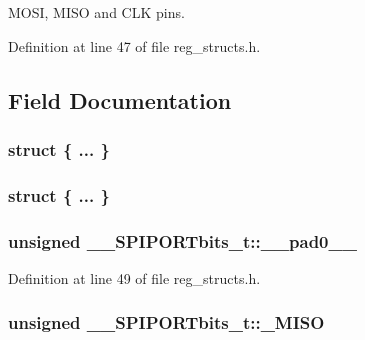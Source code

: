 M\-O\-S\-I, M\-I\-S\-O and C\-L\-K pins. 

Definition at line 47 of file reg\-\_\-structs.\-h.



\subsection{Field Documentation}
\hypertarget{union_____s_p_i_p_o_r_tbits__t_a6fab1639d02b4dc3b97c6d30adcb6aba}{\subsubsection[{"@5}]{\setlength{\rightskip}{0pt plus 5cm}struct \{ ... \} }}\label{union_____s_p_i_p_o_r_tbits__t_a6fab1639d02b4dc3b97c6d30adcb6aba}
\hypertarget{union_____s_p_i_p_o_r_tbits__t_a4b5b807caba6b1efc8ea89424950b34e}{\subsubsection[{"@7}]{\setlength{\rightskip}{0pt plus 5cm}struct \{ ... \} }}\label{union_____s_p_i_p_o_r_tbits__t_a4b5b807caba6b1efc8ea89424950b34e}
\hypertarget{union_____s_p_i_p_o_r_tbits__t_adaa7058ebdf3984a666270efbbd35783}{
\subsubsection[{\-\_\-\-\_\-pad0\-\_\-\-\_\-}]{\setlength{\rightskip}{0pt plus 5cm}unsigned \-\_\-\-\_\-\-S\-P\-I\-P\-O\-R\-Tbits\-\_\-t\-::\-\_\-\-\_\-pad0\-\_\-\-\_\-}}\label{union_____s_p_i_p_o_r_tbits__t_adaa7058ebdf3984a666270efbbd35783}


Definition at line 49 of file reg\-\_\-structs.\-h.

\hypertarget{union_____s_p_i_p_o_r_tbits__t_a495a90d64370d78287cb8ab826e3822e}{
\subsubsection[{\-\_\-\-M\-I\-S\-O}]{\setlength{\rightskip}{0pt plus 5cm}unsigned \-\_\-\-\_\-\-S\-P\-I\-P\-O\-R\-Tbits\-\_\-t\-::\-\_\-\-M\-I\-S\-O}}\label{union_____s_p_i_p_o_r_tbits__t_a495a90d64370d78287cb8ab826e3822e}


